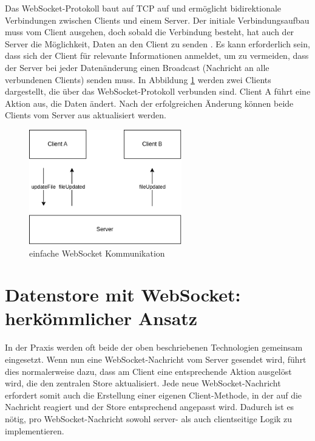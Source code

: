 \documentclass[12pt]{book}          %
\begin{document}
Das WebSocket-Protokoll baut auf TCP auf und ermöglicht bidirektionale Verbindungen zwischen Clients und einem Server. Der initiale Verbindungsaufbau muss vom Client ausgehen, doch sobald die Verbindung besteht, hat auch der Server die Möglichkeit, Daten an den Client zu senden \cite[184-185]{ackermann_webentwicklung_2021}. Es kann erforderlich sein, dass sich der Client für relevante Informationen anmeldet, um zu vermeiden, dass der Server bei jeder Datenänderung einen Broadcast (Nachricht an alle verbundenen Clients) senden muss. In Abbildung \ref{easy-websocket-communication} werden zwei Clients dargestellt, die über das WebSocket-Protokoll verbunden sind. Client A führt eine Aktion aus, die Daten ändert. Nach der erfolgreichen Änderung können beide Clients vom Server aus aktualisiert werden.

\begin{figure}[htbp]
\centering
\includegraphics[height=5cm]{abbildungen/websocket-2-clients.png}
\caption{einfache WebSocket Kommunikation}
\label{easy-websocket-communication}
\end{figure}


\section{Datenstore mit WebSocket: herkömmlicher Ansatz}
\label{sec-datenstore-mit-websocket-herkoemmlicher-ansatz}

In der Praxis werden oft beide der oben beschriebenen Technologien gemeinsam eingesetzt. Wenn nun eine WebSocket-Nachricht vom Server gesendet wird, führt dies normalerweise dazu, dass am Client eine entsprechende Aktion ausgelöst wird, die den zentralen Store aktualisiert. Jede neue WebSocket-Nachricht erfordert somit auch die Erstellung einer eigenen Client-Methode, in der auf die Nachricht reagiert und der Store entsprechend angepasst wird. Dadurch ist es nötig, pro WebSocket-Nachricht sowohl server- als auch clientseitige Logik zu implementieren.\\
\end{document}
